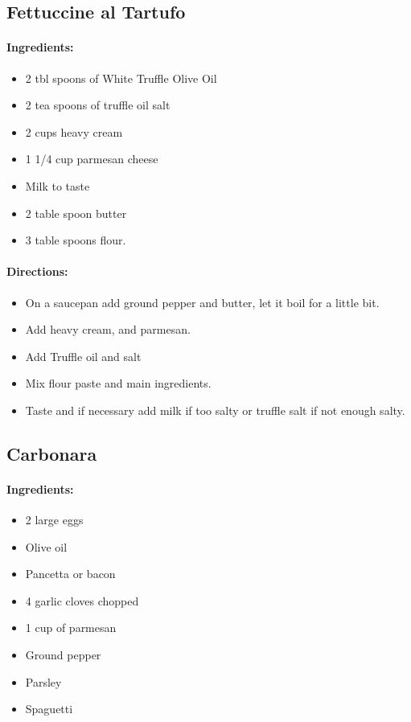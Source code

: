 \documentclass{article}
\begin{document}
\subsection{Fettuccine al Tartufo}

\paragraph{Ingredients:}
\begin{itemize}
    \item 2 tbl spoons of White Truffle Olive Oil
    \item 2 tea spoons of truffle oil salt
    \item 2 cups heavy cream
    \item 1 1/4 cup parmesan cheese
    \item Milk to taste
    \item 2 table spoon butter
    \item 3 table spoons flour.
\end{itemize}

\paragraph{Directions:}
\begin{itemize}
    \item On a saucepan add ground pepper and butter, let it boil for a little bit.
    \item Add heavy cream, and parmesan.
    \item Add Truffle oil and salt
    \item Mix flour paste and main ingredients.
    \item Taste and if necessary add milk if too salty or truffle salt if not enough salty.
\end{itemize}

\subsection{Carbonara}

\paragraph{Ingredients:}
\begin{itemize}
    \item 2 large eggs
    \item Olive oil
    \item Pancetta or bacon
    \item 4 garlic cloves chopped
    \item 1 cup of parmesan
    \item Ground pepper
    \item Parsley
    \item Spaguetti
\end{itemize}
\end{document}
